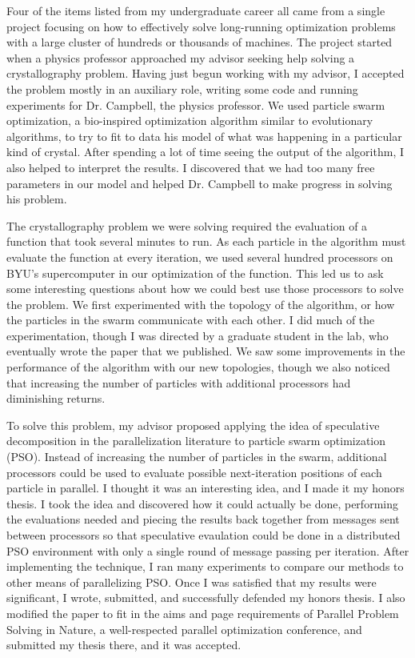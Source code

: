 \documentclass[onecolumn, 12pt]{article}
\begin{document}
Four of the items listed from my undergraduate career all came from a single
project focusing on how to effectively solve long-running optimization problems
with a large cluster of hundreds or thousands of machines.  The project started
when a physics professor approached my advisor seeking help solving a
crystallography problem.  Having just begun working with my advisor, I accepted
the problem mostly in an auxiliary role, writing some code and running
experiments for Dr. Campbell, the physics professor.  We used particle swarm
optimization, a bio-inspired optimization algorithm similar to evolutionary
algorithms, to try to fit to data his model of what was happening in a
particular kind of crystal.  After spending a lot of time seeing the output of
the algorithm, I also helped to interpret the results.  I discovered that we
had too many free parameters in our model and helped Dr. Campbell to make
progress in solving his problem.  

The crystallography problem we were solving required the evaluation of a
function that took several minutes to run.  As each particle in the algorithm
must evaluate the function at every iteration, we used several hundred
processors on BYU's supercomputer in our optimization of the function.  This
led us to ask some interesting questions about how we could best use those
processors to solve the problem.  We first experimented with the topology of
the algorithm, or how the particles in the swarm communicate with each other.
I did much of the experimentation, though I was directed by a graduate student
in the lab, who eventually wrote the paper that we published.  We saw some
improvements in the performance of the algorithm with our new topologies,
though we also noticed that increasing the number of particles with additional
processors had diminishing returns.

To solve this problem, my advisor proposed applying the idea of speculative
decomposition in the parallelization literature to particle swarm optimization
(PSO).  Instead of increasing the number of particles in the swarm, additional
processors could be used to evaluate possible next-iteration positions of each
particle in parallel.  I thought it was an interesting idea, and I made it my
honors thesis.  I took the idea and discovered how it could actually be done,
performing the evaluations needed and piecing the results back together from
messages sent between processors so that speculative evaulation could be done
in a distributed PSO environment with only a single round of message passing
per iteration.  After implementing the technique, I ran many experiments to
compare our methods to other means of parallelizing PSO.  Once I was satisfied
that my results were significant, I wrote, submitted, and successfully defended
my honors thesis.  I also modified the paper to fit in the aims and page
requirements of Parallel Problem Solving in Nature, a well-respected parallel
optimization conference, and submitted my thesis there, and it was accepted.
\end{document}
